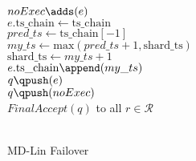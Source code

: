 \begin{algorithm}[!tb]
{{{{                        $noExec\adds(e)$\\
                        \Continue
                    }
                    $e.\mathrm{ts\_chain \gets ts\_chain}$\\
                    $pred\_ts \mathrm{\gets ts\_chain[-1]}$\\
                }
                $my\_ts \gets \mathrm{max}(pred\_ts+1, \mathrm{shard\_ts})$\\
                $\mathrm{shard\_ts} \gets my\_ts + 1$\\
                $e.\mathrm{ts\_chain}\append(my\_ts)$\\
                \label{B_end}
                $q\qpush(e)$\\
            }
        $q\qpush(noExec)$\\
        \Send $\textit{FinalAccept}(\textit{q})$ to all $r \in \mathcal{R}$\\
        \\
    }
    \caption{MD-Lin Failover}
    \label{failover}
\end{algorithm}


